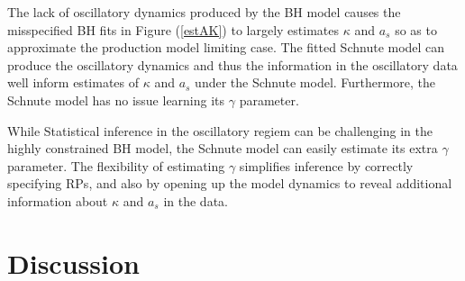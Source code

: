 %
The lack of oscillatory dynamics produced by the BH model causes the misspecified 
BH fits in Figure (\ref{estAK}) to largely estimates $\kappa$ and $a_s$ so as to 
approximate the production model limiting case. The fitted Schnute model can 
produce the oscillatory dynamics and thus the information in the oscillatory data 
well inform estimates of $\kappa$ and $a_s$ under the Schnute model. Furthermore, 
the Schnute model has no issue learning its $\gamma$ parameter.

%
While Statistical inference in the oscillatory regiem can be challenging in 
the highly constrained BH model, the Schnute model can easily estimate its extra 
$\gamma$ parameter. The flexibility of estimating $\gamma$ simplifies inference by 
correctly specifying RPs, and also by opening up the model dynamics to reveal 
additional information about $\kappa$ and $a_s$ in the data. %


%
\clearpage
\section{Discussion}

